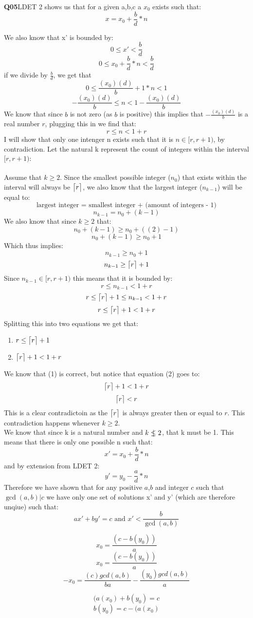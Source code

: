 \documentclass[11pt]{article}
\DeclarePairedDelimiter{\ceil}{\lceil}{\rceil}
\newcommand{\nlet}{%
  \mathrel{\ooalign{$\leq$\cr\hidewidth$|$\hidewidth}}%
}
\begin{document}
\textbf{Q05}LDET 2 shows us that for a given a,b,c a $x_0$ exists such that:
\[ x = x_0 + \frac{b}{d} * n \]

We also know that x' is bounded by:
\[ 0\leq x'< \frac{b}{d}\]
\[ 0\leq x_0 + \frac{b}{d} * n < \frac{b}{d}\]
if we divide by $\frac{b}{d}$, we get that
\[ 0\leq \frac{(x_0)(d)}{b} + 1 * n < 1\]
\[ -\frac{(x_0)(d)}{b} \leq   n < 1-\frac{(x_0)(d)}{b}\]
We know that since $b$ is not zero (as $b$ is positive) this implies that $-\frac{(x_0)(d)}{b}$ is a real number $r$, plugging this in we find that:
\[r \leq  n < 1+ r\]
I will show that only one intenger n exists such that it is $n \in [r,r+1)$, by contradiction. Let the natural k represent the count of integers within the interval $[r,r+1)$:\\\\
Assume that $k\geq2$. Since the smallest possible integer ($n_0$) that exists within the interval will always be $\ceil[\big]{r}$, we also know that the largest integer ($n_{k-1}$) will be equal to:
\[ \text{largest integer = smallest integer + (amount of integers - 1)}\]
\[ n_{k-1} = n_0 + (k - 1)\]
We also know that since $k\geq2$ that:
\[ n_0 + (k - 1) \geq n_0 + ((2) - 1) \]
\[ n_0 + (k - 1) \geq n_0 + 1 \]
Which thus implies:
\[ n_{k-1} \geq n_0 + 1\]
\[ n_{k-1} \geq \ceil[\big]{r} + 1\]
Since $n_{k-1} \in [r,r+1)$ this means that it is bounded by:
\[r \leq n_{k-1} < 1+ r\]
\[r \leq \ceil[\big]{r} + 1 \leq n_{k-1} < 1+ r\]
\[r \leq \ceil[\big]{r} + 1 < 1+ r\]
Splitting this into two equations we get that:
\begin{enumerate}
\item $r \leq \ceil[\big]{r} + 1$
\item $\ceil[\big]{r} + 1 < 1+ r$
\end{enumerate}
We know that (1) is correct, but notice that equation (2) goes to:
\[\ceil[\big]{r} + 1 < 1+ r\]
\[\ceil[\big]{r} < r\]
This is a clear contradictoin as the $\ceil[\big]{r}$ is always greater then or equal to $r$. This contradiction happens whenever $k\geq2$.\\
We know that since k is a natural number and $k \nlet 2$, that k must be 1. This means that there is only one possible n such that:
\[ x' = x_0 + \frac{b}{d} * n \]
and by extension from LDET 2:
\[ y' = y_0 - \frac{a}{d} * n \]
Therefore we have shown that for any positive $a$,$b$ and integer $c$ such that $\gcd(a,b)|c$ we have only one set of solutions x' and y' (which are therefore unqiue) such that:
\[ ax'+ by' = c  \text{ and } x' < \frac{b}{\gcd(a,b)} \]

\[ x_0 = \frac{(c- b(y_0))}{a}\]
\[ x_0 = \frac{(c- b(y_0))}{a}\]
\[ - x_0 = \frac{(c)gcd(a,b)}{ba}-  \frac{(y_0)gcd(a,b)}{a}\]

\[ (a(x_0)+b(y_0) = c \]
\[  b(y_0) = c - (a(x_0) \]
\end{document}
